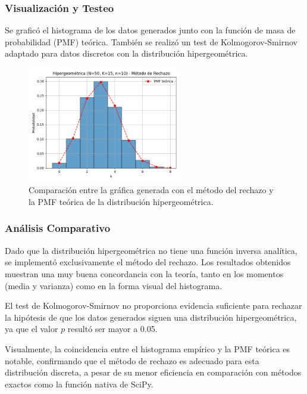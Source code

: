 \documentclass{article}
\begin{document}
\vspace{0.5em}
\subsubsection{Visualización y Testeo}

Se graficó el histograma de los datos generados junto con la función de masa de probabilidad (PMF) teórica. También se realizó un test de Kolmogorov-Smirnov adaptado para datos discretos con la distribución hipergeométrica.


\begin{figure}[H]
    \centering
    \includegraphics[width=0.6\textwidth]{visualizaciones/hipergeometrica_rechazo.png}
    \caption{Comparación entre la gráfica generada con el método del rechazo y la PMF teórica de la distribución hipergeométrica.}
    \label{fig:hipergeometrica_rechazo}
\end{figure}

\subsubsection{Análisis Comparativo}
Dado que la distribución hipergeométrica no tiene una función inversa analítica, se implementó exclusivamente el método del rechazo. Los resultados obtenidos muestran una muy buena concordancia con la teoría, tanto en los momentos (media y varianza) como en la forma visual del histograma.

El test de Kolmogorov-Smirnov no proporciona evidencia suficiente para rechazar la hipótesis de que los datos generados siguen una distribución hipergeométrica, ya que el valor $p$ resultó ser mayor a 0.05.

Visualmente, la coincidencia entre el histograma empírico y la PMF teórica es notable, confirmando que el método de rechazo es adecuado para esta distribución discreta, a pesar de su menor eficiencia en comparación con métodos exactos como la función nativa de SciPy.
\end{document}
